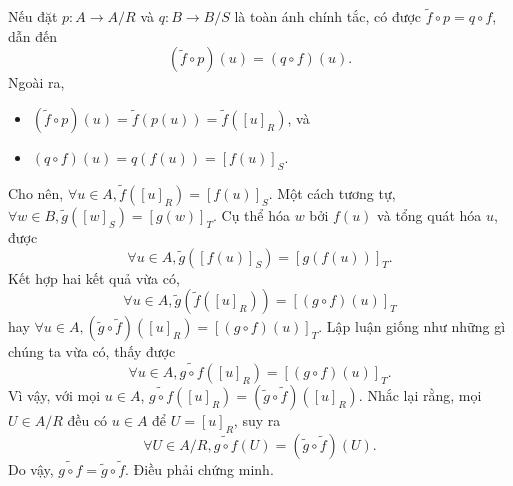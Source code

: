 Nếu đặt $p: A \to A/R$ và $q: B \to B/S$ là toàn ánh chính tắc, có được $\tilde{f} \circ p = q \circ f$, dẫn đến \begin{equation*}
   \left(\tilde{f} \circ p\right)(u) = (q \circ f)(u).
\end{equation*}
Ngoài ra, \begin{itemize}
   \item $\left(\tilde{f} \circ p\right)(u) = \tilde{f}(p(u)) = \tilde{f}([u]_R)$, và
   \item $(q \circ f)(u) = q(f(u)) = [f(u)]_S$.
\end{itemize}
Cho nên, $\forall u \in A, \tilde{f}([u]_R) = \left[f(u)\right]_S$. Một cách tương tự, $\forall w \in B, \tilde{g}([w]_S) = [g(w)]_T$. Cụ thể hóa $w$ bởi $f(u)$ và tổng quát hóa $u$, được 
$$\forall u \in A, \tilde{g}([f(u)]_S) = [g(f(u))]_T.$$
Kết hợp hai kết quả vừa có, \begin{equation*}
   \forall u \in A, \tilde{g}\left(\tilde{f}([u]_R)\right) = [(g \circ f)(u)]_T
\end{equation*}
hay $\forall u \in A, \left(\tilde{g} \circ \tilde{f}\right)([u]_R) = [(g \circ f)(u)]_T$. Lập luận giống như những gì chúng ta vừa có, thấy được 
\begin{equation*}
   \forall u \in A, \widetilde{g \circ f}([u]_R) = [(g \circ f)(u)]_T.
\end{equation*}
Vì vậy, với mọi $u \in A$, $\widetilde{g \circ f}([u]_R) = \left(\tilde{g} \circ \tilde{f}\right)([u]_R)$. Nhắc lại rằng, mọi $U \in A/R$ đều có $u \in A$ để $U = [u]_R$, suy ra 
\begin{equation*}
   \forall U \in A/R, \widetilde{g \circ f}(U) = \left(\tilde{g} \circ \tilde{f}\right)(U).
\end{equation*}
Do vậy, $\widetilde{g \circ f} = \tilde{g} \circ \tilde{f}$. Điều phải chứng minh.
